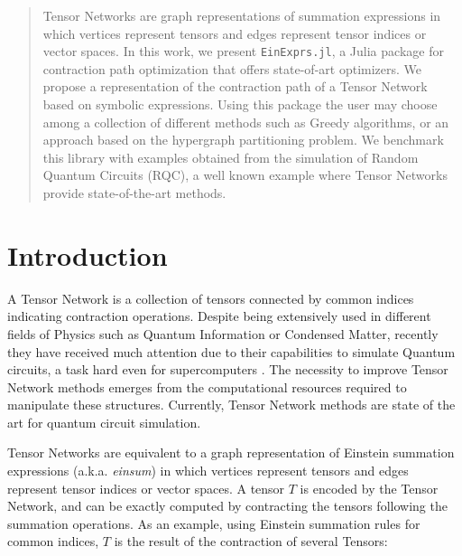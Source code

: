 \documentclass{juliacon}
\begin{document}


\maketitle

\begin{abstract}

Tensor Networks are graph representations of summation expressions in which vertices represent tensors and edges represent tensor indices or vector spaces. In this work, we present \texttt{EinExprs.jl}, a Julia package for contraction path optimization that offers state-of-art optimizers. We propose a representation of the contraction path of a Tensor Network based on symbolic expressions. Using this package the user may choose among a collection of different methods such as Greedy algorithms, or an approach based on the hypergraph partitioning problem. We benchmark this library with examples obtained from the simulation of Random Quantum Circuits (RQC), a well known example where Tensor Networks provide state-of-the-art methods.

\end{abstract}

\section{Introduction}
A Tensor Network is a collection of tensors connected by common indices indicating contraction operations. Despite being extensively used in different fields of Physics such as Quantum Information \cite{evenbly2022practical} or Condensed Matter\cite{SCHOLLWOCK201196}, recently they have received much attention due to their capabilities to simulate Quantum circuits, a task hard even for supercomputers \cite{PhysRevX.10.041038}. The necessity to improve Tensor Network methods emerges from the computational resources required to manipulate these structures. Currently, Tensor Network methods are state of the art for quantum circuit simulation.

Tensor Networks are equivalent to a graph representation of Einstein summation expressions (a.k.a. \textit{einsum}) in which vertices represent tensors and edges represent tensor indices or vector spaces. A tensor $T$ is encoded by the Tensor Network, and can be exactly computed by contracting the tensors following the summation operations. As an example, using Einstein summation rules for common indices, $T$ is the result of the contraction of several Tensors:
\end{document}
